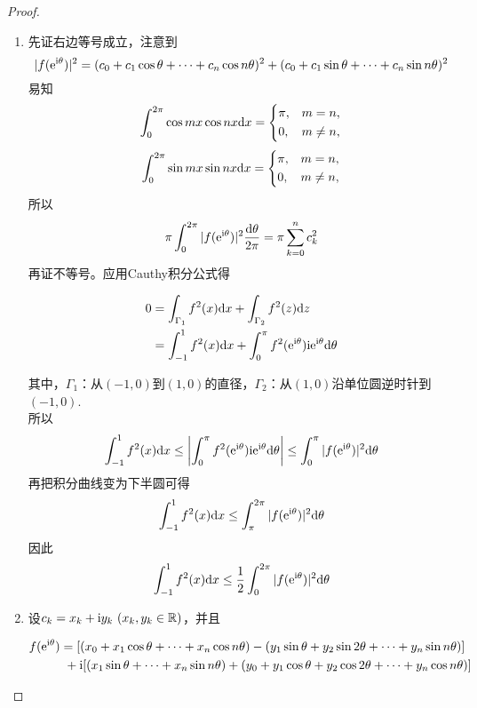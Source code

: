 \begin{proof}

    \begin{enumerate}

        \item 
        先证右边等号成立，注意到
        $$|f(\mathrm{e}^{\mathrm{i} \theta})|^2 = (c_0 + c_1 \cos{\theta} + \cdots + c_n \cos{n\theta})^2 + (c_0 + c_1 \sin{\theta} + \cdots + c_n \sin{n\theta})^2$$
        易知
        $$\int_{0}^{2\pi}{\cos{mx}\cos{nx}}\mathrm{d} x = \left\{ 
        \begin{aligned}
            & \pi, & m = n, \\
            & 0, & m \neq n,
        \end{aligned} \right.$$
        $$\int_{0}^{2\pi}{\sin{mx}\sin{nx}}\mathrm{d} x = \left\{ 
        \begin{aligned}
            & \pi, & m = n, \\
            & 0, & m \neq n,
        \end{aligned} \right.$$
        所以
        $$\pi \int_{0}^{2\pi}{|f(\mathrm{e}^{\mathrm{i} \theta})|^2}\dfrac{\mathrm{d} \theta}{2 \pi} = \pi \sum\limits_{k = 0}^{n}{c_k^2}$$
        再证不等号。应用\textup{Cauthy}积分公式得
        
        \begin{align*}
            0 & = \int_{\Gamma_1}{f^2(x)}\mathrm{d} x + \int_{\Gamma_2}{f^2(z)}\mathrm{d} z \\
            & = \int_{-1}^{1}{f^2(x)}\mathrm{d} x + \int_{0}^{\pi}{f^2(\mathrm{e}^{\mathrm{i} \theta})\mathrm{i} \mathrm{e}^{\mathrm{i} \theta}}\mathrm{d} \theta 
        \end{align*}

        其中，$\Gamma_1$：从$(-1, 0)$到$(1, 0)$的直径，$\Gamma_2$：从$(1, 0)$沿单位圆逆时针到$(-1, 0)$. \\
        所以
        $$\int_{-1}^{1}{f^2(x)}\mathrm{d} x \leq \left| \int_{0}^{\pi}{f^2(\mathrm{e}^{\mathrm{i} \theta})\mathrm{i} \mathrm{e}^{\mathrm{i} \theta}}\mathrm{d} \theta \right| \leq \int_{0}^{\pi}{|f(\mathrm{e}^{\mathrm{i} \theta})|^2}\mathrm{d} \theta$$
        再把积分曲线变为下半圆可得
        $$\int_{-1}^{1}{f^2(x)}\mathrm{d} x \leq \int_{\pi}^{2\pi}{|f(\mathrm{e}^{\mathrm{i} \theta})|^2}\mathrm{d} \theta$$
        因此
        $$\int_{-1}^{1}{f^2(x)}\mathrm{d} x \leq \dfrac{1}{2} \int_{0}^{2\pi}{|f(\mathrm{e}^{\mathrm{i} \theta})|^2}\mathrm{d} \theta$$

    \item 
        设$c_k = x_k + \mathrm{i} y_k \ (x_k, y_k \in \mathbb{R})$，并且

    \begin{align*}
        f(\mathrm{e}^{\mathrm{i} \theta}) & = [(x_0 + x_1 \cos{\theta} + \cdots + x_n \cos{n\theta}) - (y_1 \sin{\theta} + y_2 \sin{2\theta} + \cdots + y_n \sin{n\theta})] \\
        & \ + \mathrm{i}[(x_1 \sin{\theta} + \cdots + x_n \sin{n\theta}) + (y_0 + y_1 \cos{\theta} + y_2 \cos{2\theta} + \cdots + y_n \cos{n\theta})]
    \end{align*}


\end{enumerate}
\end{proof}
